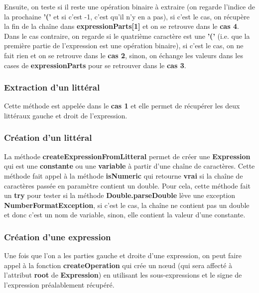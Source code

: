 \documentclass[a4paper]{article}
\begin{document}
  Ensuite, on teste si il reste une opération binaire à extraire (on regarde
  l'indice de la prochaine \textbf{'('} et si c'est -1, c'est qu'il n'y en a
  pas), si c'est le cas, on récupère la fin de la chaîne dans
  \textbf{expressionParts[1]} et on se retrouve dans le \textbf{cas 4}. Dans le
  cas contraire, on regarde si le quatrième caractère est une \textbf{'('} (i.e.
  que la première partie de l'expression est une opération binaire), si c'est
  le cas, on ne fait rien et on se retrouve dans le \textbf{cas 2}, sinon, on
  échange les valeurs dans les cases de \textbf{expressionParts} pour se
  retrouver dans le \textbf{cas 3}.
  
  \subsubsection{Extraction d'un littéral}%
  \label{ssub:Extraction d'un littéral}

  Cette méthode est appelée dans le \textbf{cas 1} et elle permet de récupérer
  les deux littéraux gauche et droit de l'expression.

  \subsubsection{Création d'un littéral}%
  \label{ssub:Création d'un littéral}

  La méthode \textbf{createExpressionFromLitteral} permet de créer une
  \textbf{Expression} qui est une \textbf{constante} ou une \textbf{variable} à
  partir d'une chaîne de caractères. Cette méthode fait appel à la méthode
  \textbf{isNumeric} qui retourne \textbf{vrai} si la chaîne de caractères
  passée en paramètre contient un double. Pour cela, cette méthode fait un
  \textbf{try} pour tester si la méthode \textbf{Double.parseDouble} lève une
  exception \textbf{NumberFormatException}, si c'est le cas, la chaîne ne
  contient pas un double et donc c'est un nom de variable, sinon, elle contient
  la valeur d'une constante.

  \subsubsection{Création d'une expression}%
  \label{ssub:Création d'une expression}
  
  Une fois que l'on a les parties gauche et droite d'une expression, on peut
  faire appel à la fonction \textbf{createOperation} qui crée un nœud (qui
  sera affecté à l'attribut \textbf{root} de \textbf{Expression}) en
  utilisant les sous-expressions et le signe de l'expression préalablement
  récupéré.
  
  
  
\end{document}
